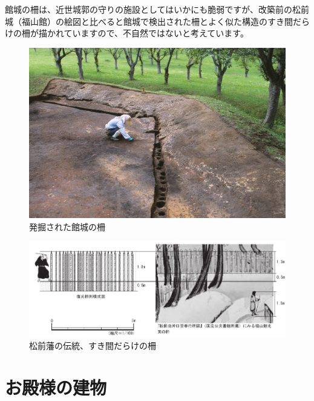 \documentclass[11pt,report]{jsbook}
\begin{document}
館城の柵は、近世城郭の守りの施設としてはいかにも脆弱ですが、改築前の松前城（福山館）の絵図と比べると館城で検出された柵とよく似た構造のすき間だらけの柵が描かれていますので、不自然ではないと考えています。

\begin{figure}[h]
\centering
\includegraphics[width=160truemm]{fig/09.JPG}
\caption{発掘された館城の柵}
\label{fig09}
\end{figure}

\begin{figure}[h]
\centering
\includegraphics[width=160truemm]{fig/10.pdf}
\caption{松前藩の伝統、すき間だらけの柵}
\label{fig10}
\end{figure}

\newpage
\chapter{お殿様の建物}
\end{document}
